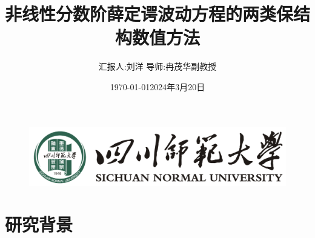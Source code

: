 \documentclass[aspectratio=169]{beamer}
\title[非线性分数阶薛定谔波动方程的两类保结构数值方法
]{非线性分数阶薛定谔波动方程的两类保结构数值方法}
\author[刘洋]{\footnotesize 汇报人:刘洋 \quad 导师:冉茂华\quad 副教授}
\institute[偏微分方程数值解]{\footnotesize 计算数学}
\date{\footnotesize \vskip -10pt \today}
\date{2024年3月20日}
\numberwithin{theorem}{section} %
\numberwithin{equation}{section}%
\numberwithin{figure}{section}%
\numberwithin{table}{section}%
\begin{document}
\kaishu
\begin{frame}
	\titlepage
	\vspace{-2mm}
	\begin{figure}[htpb]
		\begin{center}
			\includegraphics[width=0.45\linewidth]{pic/SICNU_Logo2.png}
		\end{center}
	\end{figure}
\end{frame}
\begin{frame}
\tableofcontents[sectionstyle=show,subsectionstyle=show/shaded/hide,subsubsectionstyle=show/shaded/hide]
\end{frame}

\section{研究背景}

\end{document}
